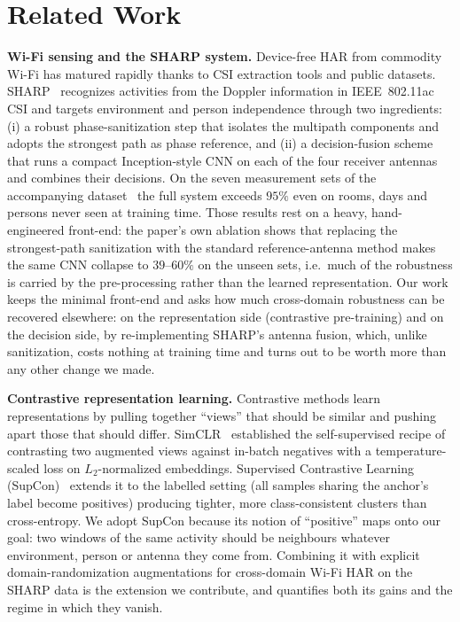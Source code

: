 
\section{Related Work}
\label{sec:related_work}

\textbf{Wi-Fi sensing and the SHARP system.}
Device-free HAR from commodity Wi-Fi has matured rapidly thanks to CSI extraction
tools and public datasets. SHARP~\cite{sharp} recognizes activities from the 
Doppler information in IEEE~802.11ac CSI and targets environment and person 
independence through two ingredients: (i) a robust phase-sanitization step that isolates the
multipath components and adopts the strongest path as phase reference, and
(ii) a decision-fusion scheme that runs a compact Inception-style CNN on
each of the four receiver antennas and combines their decisions. On the seven
measurement sets of the accompanying dataset~\cite{csidataset} the full system
exceeds $95\%$ even on rooms, days and persons never seen at training time. Those
results rest on a heavy, hand-engineered front-end: the paper's own ablation
shows that replacing the strongest-path sanitization with the standard
reference-antenna method makes the same CNN collapse to $39$--$60\%$ on
the unseen sets, i.e.\ much of the robustness is carried by the pre-processing
rather than the learned representation. Our work keeps the minimal front-end
and asks how much cross-domain robustness can be recovered elsewhere: on the
representation side (contrastive pre-training) and on the
decision side, by re-implementing SHARP's antenna fusion, which,
unlike sanitization, costs nothing at training time and turns out to be worth
more than any other change we made.

\textbf{Contrastive representation learning.}
Contrastive methods learn representations by pulling together ``views'' that
should be similar and pushing apart those that should differ.
SimCLR~\cite{simclr} established the self-supervised recipe of contrasting two
augmented views against in-batch negatives with a temperature-scaled
loss on $L_2$-normalized embeddings. Supervised Contrastive Learning
(SupCon)~\cite{supcon} extends it to
the labelled setting (all samples sharing the anchor's label become
positives) producing tighter, more class-consistent clusters than cross-entropy.
We adopt SupCon because its notion of ``positive'' maps onto our goal: two
windows of the same activity should be neighbours whatever environment,
person or antenna they come from. Combining it with explicit
domain-randomization augmentations for cross-domain Wi-Fi HAR on the SHARP data
is the extension we contribute, and  quantifies both its
gains and the regime in which they vanish.
